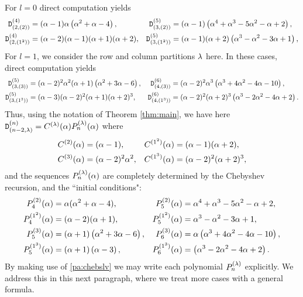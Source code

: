 \mdef \label{pa:1dgdets}
For $l=0$  %
direct computation yields
\begin{align*}
{\mathtt D}^{(4)}_{(2,(2))}&=(\alpha -1) \alpha  \left(\alpha ^2+\alpha -4\right),& {\mathtt D}^{(5)}_{(3,(2))}&=(\alpha -1) \left(\alpha ^4+\alpha ^3-5 \alpha ^2-\alpha +2\right),\\
    {\mathtt D}^{(4)}_{(2,(1^2))}&=(\alpha -2) (\alpha -1) (\alpha +1) (\alpha +2),&
   {\mathtt D}^{(5)}_{(3,(1^2))}&=(\alpha -1) (\alpha +2) \left(\alpha ^3-\alpha ^2-3 \alpha +1\right),
\end{align*}  
For $l=1$, we consider the row and column partitions $\lambda$ here. 
In these cases, direct computation yields
\begin{align*}
    {\mathtt D}^{(5)}_{(3,(3))}&=(\alpha -2)^2 \alpha ^2 (\alpha +1) \left(\alpha ^2+3 \alpha -6\right),& {\mathtt D}^{(6)}_{(4,(3))}&=(\alpha -2)^2 \alpha ^3 \left(\alpha ^3+4 \alpha ^2-4 \alpha -10\right),\\
    {\mathtt D}^{(5)}_{(3,(1^3))}&=(\alpha -3) (\alpha -2)^2 (\alpha +1) (\alpha +2)^3,&
    {\mathtt D}^{(6)}_{(4,(1^3))}&=(\alpha -2)^2 (\alpha +2)^3 \left(\alpha ^3-2 \alpha ^2-4 \alpha +2\right).
\end{align*}
Thus, using the notation of Theorem \ref{thm:main}, 
we have here ${\mathtt D}^{(n)}_{(n-2,\lambda)}=C^{(\lambda)}(\alpha) P^{(\lambda)}_{n}(\alpha)$ where
\begin{align*}
    C^{(2)}(\alpha)&=(\alpha-1), &    C^{(1^2)}(\alpha)&=(\alpha-1)(\alpha+2),\\
    C^{(3)}(\alpha)&=(\alpha-2)^2\alpha^2, &    C^{(1^3)}(\alpha)&=(\alpha-2)^2(\alpha+2)^3,
\end{align*}
and the sequences $P_n^{(\lambda)}(\alpha)$ are completely determined by the Chebyshev recursion, and the ``initial conditions":
\begin{align*}
    P_4^{(2)}(\alpha)&=\alpha(\alpha^2+\alpha-4), &        P_5^{(2)}(\alpha)&=\alpha^4+\alpha^3-5\alpha^2-\alpha+2,\\
    P_4^{(1^2)}(\alpha)&=(\alpha-2)(\alpha+1), &        P_5^{(1^2)}(\alpha)&=\alpha ^3-\alpha ^2-3 \alpha +1,\\
    P_5^{(3)}(\alpha)&=(\alpha +1) \left(\alpha ^2+3 \alpha -6\right), &        P_6^{(3)}(\alpha)&=\alpha  \left(\alpha ^3+4 \alpha ^2-4 \alpha -10\right),\\
    P_5^{(1^3)}(\alpha)&=(\alpha +1) \left(\alpha-3\right), &        P_6^{(1^3)}(\alpha)&=  \left(\alpha ^3-2 \alpha ^2-4 \alpha +2\right).
\end{align*}
By making use of \ref{pa:chebslv} we may write each polynomial $P_n^{(\lambda)}$ explicitly. We address this in this next paragraph, where we treat more cases with a general formula.


